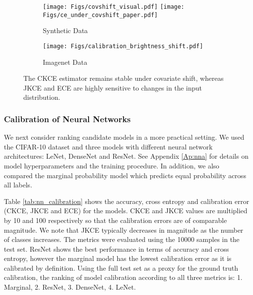\documentclass[twocolumn]{article}
\theoremstyle{definition}
\begin{document}
\begin{figure*}[ht]
    \centering
    \begin{subfigure}[b]{0.49\linewidth} %
        \centering
        \texttt{[image: Figs/covshift\_visual.pdf]}
        \texttt{[image: Figs/ce\_under\_covshift\_paper.pdf]}
        \caption{Synthetic Data}
        \label{fig:covshift_a}
    \end{subfigure}
    \hfill
    \begin{subfigure}[b]{0.49\linewidth} %
        \centering
        \texttt{[image: Figs/calibration\_brightness\_shift.pdf]}
        \caption{Imagenet Data}
        \label{fig:covshift_b}
    \end{subfigure}
    
    \caption{The CKCE estimator remains stable under covariate shift, whereas JKCE and ECE are highly sensitive to changes in the input distribution.}
    \label{fig:covshift}
\end{figure*}

\subsubsection{Calibration of Neural Networks} \label{sec:experiments_2}

We next consider ranking candidate models in a more practical setting. We used the CIFAR-10 dataset and three models with different neural network architectures: LeNet, DenseNet and ResNet. See Appendix \ref{Ap:nna} for details on model hyperparameters and the training procedure. In addition, we also compared the marginal probability model which predicts equal probability across all labels. 

Table \ref{tab:nn_calibration} shows the accuracy, cross entropy and calibration error (CKCE, JKCE and ECE) for the models. CKCE and JKCE values are multiplied by 10 and 100 respectively so that the calibration errors are of comparable magnitude. We note that JKCE typically decreases in magnitude as the number of classes increases. The metrics were evaluated using the 10000 samples in the test set. ResNet shows the best performance in terms of accuracy and cross entropy, however the marginal model has the lowest calibration error as it is calibrated by definition. Using the full test set as a proxy for the ground truth calibration, the ranking of model calibration according to all three metrics is: 1. Marginal, 2. ResNet, 3. DenseNet, 4. LeNet.
\end{document}

